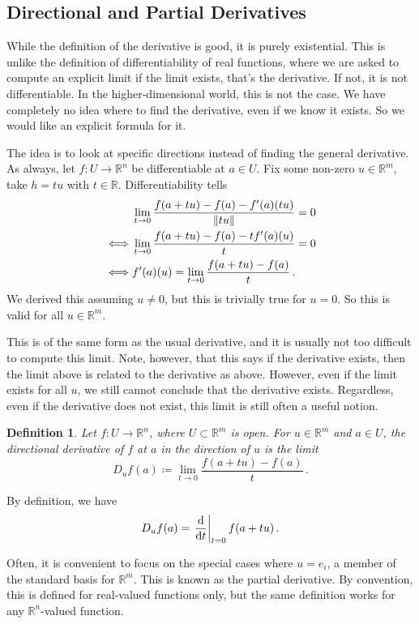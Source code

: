 \documentclass{article}
\theoremstyle{plain}\theoremheaderfont{\normalfont\itshape}\theorembodyfont{\rmfamily}\theoremseparator{.}\newtheorem*{rem}{Remark}\newtheorem*{ex}{Example}\newtheorem*{proof}{Proof}\newtheorem*{altp}{Alternative proof}
\theoremstyle{plain}\theoremheaderfont{\normalfont\bfseries}\theorembodyfont{\rmfamily}\theoremseparator{.}\newtheorem{thm}{Theorem}[section]\newtheorem{lem}[thm]{Lemma}\newtheorem{prop}[thm]{Proposition}\newtheorem*{cor}{Corollary}\newtheorem{defn}[thm]{Definition}\newtheorem{clm}[thm]{Claim}\newtheorem{clminproof}{Claim}
\theoremstyle{break}\theoremheaderfont{\normalfont\itshape}\theorembodyfont{\rmfamily}\theoremseparator{.\medskip}\newtheorem*{proofskip}{Proof}\newtheorem*{exs}{Examples}\newtheorem*{rems}{Remarks}
\theoremstyle{break}\theoremheaderfont{\normalfont\bfseries}\theorembodyfont{\rmfamily}\theoremseparator{.\medskip}\newtheorem{lemskip}[thm]{Lemma}\newtheorem{defnskip}[thm]{Definition}\newtheorem{propskip}[thm]{Proposition}\newtheorem{thmskip}[thm]{Theorem}
\begin{document}
    \subsection{Directional and Partial Derivatives}
    While the definition of the derivative is good, it is purely existential. This is unlike the definition of differentiability of real functions, where we are asked to compute an explicit limit if the limit exists, that's the derivative. If not, it is not differentiable. In the higher-dimensional world, this is not the case. We have completely no idea where to find the derivative, even if we know it exists. So we would like an explicit formula for it.

    The idea is to look at specific directions instead of finding the general derivative. As always, let \(f:U\to\mathbb{R}^n\) be differentiable at \(a\in U\). Fix some non-zero \(u\in\mathbb{R}^m\), take \(h=tu\) with \(t\in\mathbb{R}\). Differentiability tells
    \begin{align*}
        &\lim_{t\to0}\frac{f(a+tu)-f(a)-f'(a)(tu)}{\norm{tu}}=0\\
        \iff&\lim_{t\to0}\frac{f(a+tu)-f(a)-tf'(a)(u)}{t}=0\\
        \iff&f'(a)(u)=\lim_{t\to 0}\frac{f(a+tu)-f(a)}{t}\,.
    \end{align*}
    We derived this assuming \(u\ne 0\), but this is trivially true for \(u=0\). So this is valid for all \(u\in\mathbb{R}^m\).

    This is of the same form as the usual derivative, and it is usually not too difficult to compute this limit. Note, however, that this says if the derivative exists, then the limit above is related to the derivative as above. However, even if the limit exists for all \(u\), we still cannot conclude that the derivative exists. Regardless, even if the derivative does not exist, this limit is still often a useful notion.
    \begin{defn}
        Let \(f:U\to\mathbb{R}^n\), where \(U\subset\mathbb{R}^m\) is open. For \(u\in\mathbb{R}^m\) and \(a\in U\), the \textit{directional derivative} of \(f\) at \(a\) in the direction of \(u\) is the limit
        \[D_uf(a)\coloneqq\lim_{t\to 0}\frac{f(a+tu)-f(a)}{t}\,.\]
    \end{defn}
    
    By definition, we have
    \[D_uf(a)=\left.\dv{t}\right|_{t=0}f(a+tu)\,.\]
    
    Often, it is convenient to focus on the special cases where \(u=e_i\), a member of the standard basis for \(\mathbb{R}^m\). This is known as the partial derivative. By convention, this is defined for real-valued functions only, but the same definition works for any \(\mathbb{R}^n\)-valued function.
    
\end{document}
